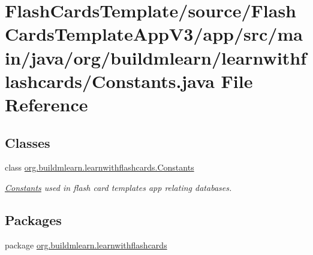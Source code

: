 \hypertarget{FlashCardsTemplate_2source_2FlashCardsTemplateAppV3_2app_2src_2main_2java_2org_2buildmlearn_2lea04b6faf9955054f7c7c030b6f90eb45a}{}\section{Flash\+Cards\+Template/source/\+Flash\+Cards\+Template\+App\+V3/app/src/main/java/org/buildmlearn/learnwithflashcards/\+Constants.java File Reference}
\label{FlashCardsTemplate_2source_2FlashCardsTemplateAppV3_2app_2src_2main_2java_2org_2buildmlearn_2lea04b6faf9955054f7c7c030b6f90eb45a}
\subsection*{Classes}
\begin{DoxyCompactItemize}
\item 
class \hyperlink{classorg_1_1buildmlearn_1_1learnwithflashcards_1_1Constants}{org.\+buildmlearn.\+learnwithflashcards.\+Constants}
\begin{DoxyCompactList}\small\item\em \hyperlink{classorg_1_1buildmlearn_1_1learnwithflashcards_1_1Constants}{Constants} used in flash card template\textquotesingle{}s app relating databases. \end{DoxyCompactList}\end{DoxyCompactItemize}
\subsection*{Packages}
\begin{DoxyCompactItemize}
\item 
package \hyperlink{namespaceorg_1_1buildmlearn_1_1learnwithflashcards}{org.\+buildmlearn.\+learnwithflashcards}
\end{DoxyCompactItemize}
